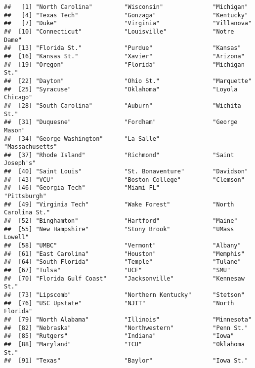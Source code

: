 \documentclass[
]{article}
\begin{document}
\begin{verbatim}
##   [1] "North Carolina"         "Wisconsin"              "Michigan"              
##   [4] "Texas Tech"             "Gonzaga"                "Kentucky"              
##   [7] "Duke"                   "Virginia"               "Villanova"             
##  [10] "Connecticut"            "Louisville"             "Notre Dame"            
##  [13] "Florida St."            "Purdue"                 "Kansas"                
##  [16] "Kansas St."             "Xavier"                 "Arizona"               
##  [19] "Oregon"                 "Florida"                "Michigan St."          
##  [22] "Dayton"                 "Ohio St."               "Marquette"             
##  [25] "Syracuse"               "Oklahoma"               "Loyola Chicago"        
##  [28] "South Carolina"         "Auburn"                 "Wichita St."           
##  [31] "Duquesne"               "Fordham"                "George Mason"          
##  [34] "George Washington"      "La Salle"               "Massachusetts"         
##  [37] "Rhode Island"           "Richmond"               "Saint Joseph's"        
##  [40] "Saint Louis"            "St. Bonaventure"        "Davidson"              
##  [43] "VCU"                    "Boston College"         "Clemson"               
##  [46] "Georgia Tech"           "Miami FL"               "Pittsburgh"            
##  [49] "Virginia Tech"          "Wake Forest"            "North Carolina St."    
##  [52] "Binghamton"             "Hartford"               "Maine"                 
##  [55] "New Hampshire"          "Stony Brook"            "UMass Lowell"          
##  [58] "UMBC"                   "Vermont"                "Albany"                
##  [61] "East Carolina"          "Houston"                "Memphis"               
##  [64] "South Florida"          "Temple"                 "Tulane"                
##  [67] "Tulsa"                  "UCF"                    "SMU"                   
##  [70] "Florida Gulf Coast"     "Jacksonville"           "Kennesaw St."          
##  [73] "Lipscomb"               "Northern Kentucky"      "Stetson"               
##  [76] "USC Upstate"            "NJIT"                   "North Florida"         
##  [79] "North Alabama"          "Illinois"               "Minnesota"             
##  [82] "Nebraska"               "Northwestern"           "Penn St."              
##  [85] "Rutgers"                "Indiana"                "Iowa"                  
##  [88] "Maryland"               "TCU"                    "Oklahoma St."          
##  [91] "Texas"                  "Baylor"                 "Iowa St."              

\end{verbatim}
\end{document}
